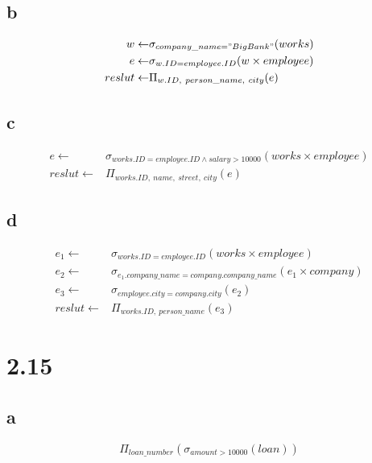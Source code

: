 \documentclass{article}
\begin{document}
    \subsection*{b}
    \begin{equation*}
        \begin{split}
            w\leftarrow&\sigma_{company\_name="BigBank"}(works)\\
            e\leftarrow&\sigma_{w.ID=employee.ID}(w\times employee)\\
            reslut\leftarrow&\Pi_{w.ID,\ person\_ name, \ city}(e)
        \end{split}
    \end{equation*}

    \subsection*{c} 
    \begin{equation*}
        \begin{split}
            e\leftarrow &\sigma_{works.ID=employee.ID\wedge salary>10000 }(works \times employee)\\
            reslut\leftarrow & \Pi_{works.ID,\ name,\ street,\ city}(e)
        \end{split}
    \end{equation*}
    \subsection*{d}
    \begin{equation*}
        \begin{split}
            e_1\leftarrow & \sigma_{works.ID=employee.ID}(works\times employee)\\
            e_2\leftarrow & \sigma_{e_1.company\_name=company.company\_name}(e_1\times company)\\
            e_3\leftarrow & \sigma_{employee.city=company.city}(e_2)\\
            reslut\leftarrow & \Pi_{works.ID,\ person\_name}(e_3)
        \end{split}
    \end{equation*}
    \section*{2.15}
    \subsection*{a} $$\Pi_{loan\_number}(\sigma_{amount>10000}(loan ))$$
\end{document}
